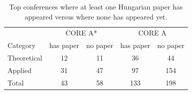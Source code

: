 \begin{table}[h]
  \centering
  \caption{Top conferences where at least one Hungarian paper has appeared versus where none has appeared yet.}
  \label{tab:conference_pies_summary}
  \begin{tabular}{l|cc|cc}
    \toprule
     & \multicolumn{2}{c|}{CORE A*} & \multicolumn{2}{c}{CORE A} \\
    Category & has paper & no paper & has paper & no paper \\
    \midrule
    Theoretical & 12 & 11 & 36 & 44 \\
    Applied & 31 & 47 & 97 & 154 \\
    \midrule
    Total & 43 & 58 & 133 & 198 \\
    \bottomrule
  \end{tabular}
\end{table}